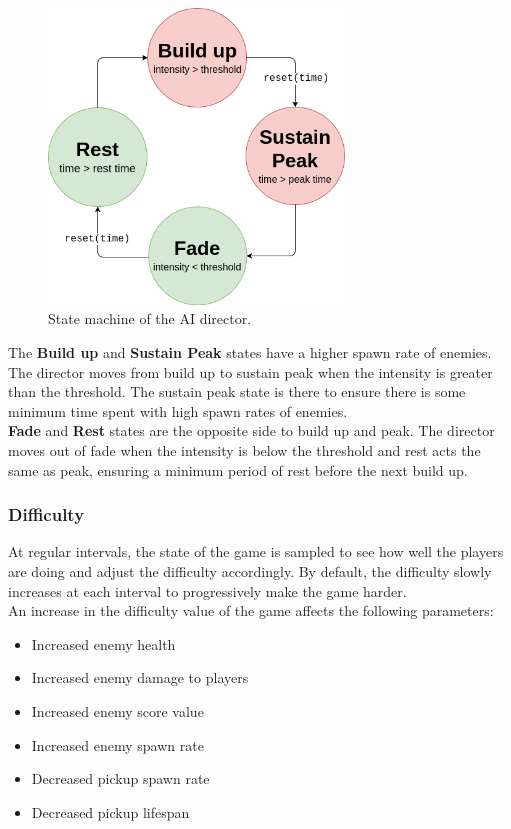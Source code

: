\documentclass{article}
\newcommand{\n}[0]{\\[\baselineskip]}
\begin{document}
\begin{figure}[H]
\centering
\includegraphics[width=0.7\textwidth, keepaspectratio]{imgs/DirectorFSM.png}
\caption{State machine of the AI director.}
\end{figure}
\noindent
The \textbf{Build up} and \textbf{Sustain Peak} states have a higher spawn rate of enemies. The director moves from build up to sustain peak when the intensity is greater than the threshold. The sustain peak state is there to ensure there is some minimum time spent with high spawn rates of enemies. 
\n
\textbf{Fade} and \textbf{Rest} states are the opposite side to build up and peak. The director moves out of fade when the intensity is below the threshold and rest acts the same as peak, ensuring a minimum period of rest before the next build up.
\subsubsection{Difficulty}
At regular intervals, the state of the game is sampled to see how well the players are doing and adjust the difficulty accordingly. By default, the difficulty slowly increases at each interval to progressively make the game harder.
\n
An increase in the difficulty value of the game affects the following parameters:
\begin{itemize}
\item Increased enemy health
\item Increased enemy damage to players
\item Increased enemy score value
\item Increased enemy spawn rate
\item Decreased pickup spawn rate
\item Decreased pickup lifespan
\end{itemize}
\end{document}
